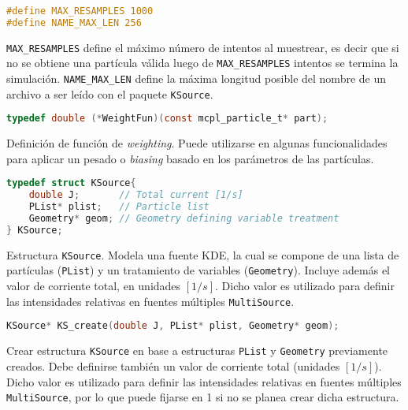 \begin{footnotesize}

\begin{lstlisting}[language=C]
#define MAX_RESAMPLES 1000
#define NAME_MAX_LEN 256
\end{lstlisting}
\begin{addmargin}[0.5cm]{0cm}
\verb|MAX_RESAMPLES| define el máximo número de intentos al muestrear, es decir que si no se obtiene una partícula válida luego de \verb|MAX_RESAMPLES| intentos se termina la simulación. \verb|NAME_MAX_LEN| define la máxima longitud posible del nombre de un archivo a ser leído con el paquete \verb|KSource|. 
\end{addmargin}

\begin{lstlisting}[language=C]
typedef double (*WeightFun)(const mcpl_particle_t* part);
\end{lstlisting}
\begin{addmargin}[0.5cm]{0cm}
Definición de función de \emph{weighting}. Puede utilizarse en algunas funcionalidades para aplicar un pesado o \emph{biasing} basado en los parámetros de las partículas.
\end{addmargin}

\begin{lstlisting}[language=C]
typedef struct KSource{
	double J;       // Total current [1/s]
	PList* plist;   // Particle list
	Geometry* geom; // Geometry defining variable treatment
} KSource;
\end{lstlisting}
\begin{addmargin}[0.5cm]{0cm}
Estructura \verb|KSource|. Modela una fuente KDE, la cual se compone de una lista de partículas (\verb|PList|) y un tratamiento de variables (\verb|Geometry|). Incluye además el valor de corriente total, en unidades $[1/s]$. Dicho valor es utilizado para definir las intensidades relativas en fuentes múltiples \verb|MultiSource|.
\end{addmargin}

\begin{lstlisting}[language=C]
KSource* KS_create(double J, PList* plist, Geometry* geom);
\end{lstlisting}
\begin{addmargin}[0.5cm]{0cm}
Crear estructura \verb|KSource| en base a estructuras \verb|PList| y \verb|Geometry| previamente creados. Debe definirse también un valor de corriente total (unidades $[1/s]$). Dicho valor es utilizado para definir las intensidades relativas en fuentes múltiples \verb|MultiSource|, por lo que puede fijarse en 1 si no se planea crear dicha estructura.
\end{addmargin}


\end{footnotesize}
